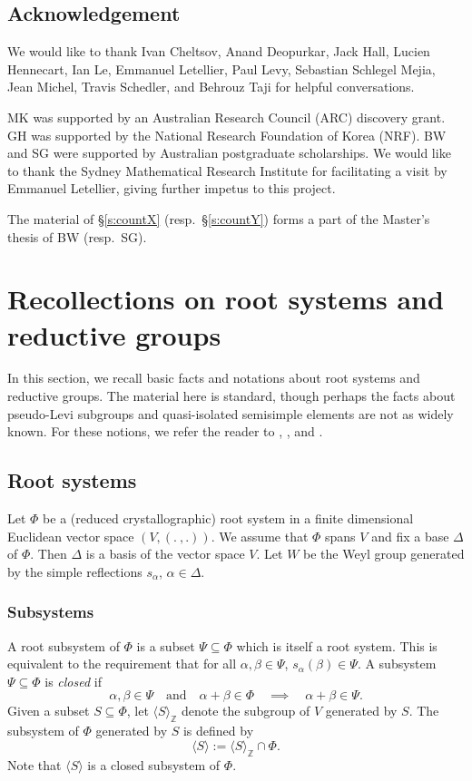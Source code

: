 \documentclass[12pt]{amsart}
\theoremstyle{plain}
\theoremstyle{definition}
\theoremstyle{remark}
\newcommand{\bZ}{\mathbb{Z}}
\begin{document}
\subsection{Acknowledgement} We would like to thank Ivan Cheltsov, Anand Deopurkar, Jack Hall, Lucien Hennecart, Ian Le, Emmanuel Letellier, Paul Levy, Sebastian Schlegel Mejia, Jean Michel, Travis Schedler, and Behrouz Taji for helpful conversations. 

MK was supported by an Australian Research Council (ARC) discovery grant. GH was supported by the National Research Foundation of Korea (NRF). BW and SG were supported by Australian postgraduate scholarships. We would like to thank the Sydney Mathematical Research Institute for facilitating a visit by Emmanuel Letellier,  giving further impetus to this project. 

The material of \S \ref{s:countX} (resp.\ \S \ref{s:countY}) forms a part of the Master's thesis of BW (resp.\ SG). 










\section{Recollections on root systems and reductive groups} \label{s:prelim}
In this section, we recall basic facts and notations about root systems and reductive groups. The material here is standard, though perhaps the facts about pseudo-Levi subgroups and quasi-isolated semisimple elements are not as widely known. For these notions, we refer the reader to \cite{MS03}, \cite{Bonnafe05}, and \cite{Taylor22}.


\subsection{Root systems} 
Let $\Phi$ be a (reduced crystallographic) root system in a finite dimensional Euclidean vector space $(V, (.\ ,.))$.  We assume that $\Phi$ spans $V$ and fix a base $\Delta$ of $\Phi$. Then $\Delta$ is a basis of the vector space $V$. Let $W$ be the Weyl group generated by the simple reflections $s_\alpha$, $\alpha \in \Delta$. 

\subsubsection{Subsystems} A root subsystem of $\Phi$ is a subset $\Psi\subseteq \Phi$ which is itself a root system. This is equivalent to the requirement that for all $\alpha, \beta\in \Psi$,  $s_\alpha(\beta)\in \Psi$. A subsystem $\Psi\subseteq \Phi$ is \emph{closed} if 
\[
\alpha, \beta\in \Psi \quad \textrm{and}\quad  \alpha+\beta\in \Phi\quad \implies \quad \alpha+\beta\in \Psi. 
\]
 Given a subset $S\subseteq \Phi$,  let $\langle S\rangle_{\bZ}$ denote the subgroup of $V$ generated by $S$.  The subsystem of $\Phi$ generated by $S$ is defined by 
  \[
  \langle S \rangle:=\langle S\rangle_{\bZ} \cap \Phi. 
  \]
Note that $ \langle S \rangle$ is a closed subsystem of $\Phi$. 
\end{document}
